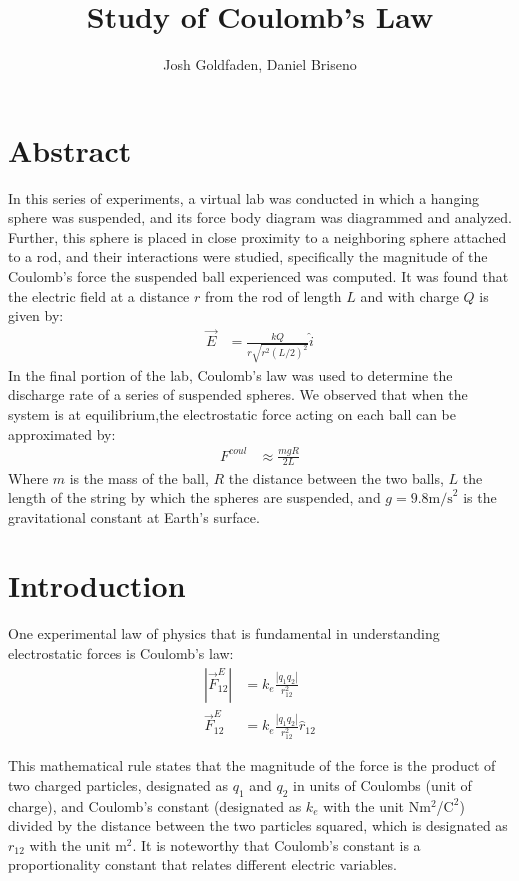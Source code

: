 \documentclass[oneside,12pt]{amsart}
\title{Study of Coulomb's Law}
\author{Josh Goldfaden, Daniel Briseno}
\date{}
\begin{document}
	\maketitle
	\section{Abstract}
	In this series of experiments, a virtual lab was conducted in which a hanging sphere was suspended, and its force body diagram was diagrammed and analyzed. Further, this sphere is placed in close proximity to a neighboring sphere attached to a rod, and their interactions were studied, specifically the magnitude of the Coulomb's force the suspended ball experienced was computed. It was found that the electric field at a distance $r$ from the rod of length $L$ and with charge $Q$ is given by:
	\begin{align*}
		\vec{E} &=  \frac{kQ}{r\sqrt{r^2(L/2)^2}}\hat{i}
	\end{align*}
	In the final portion of the lab, Coulomb’s law was used to determine the discharge rate of a series of suspended spheres. We observed that when the system is at equilibrium,the electrostatic force acting on each ball can be approximated by: 
	\begin{align*}
	F^{coul} &\approx \frac{mgR}{2L}
	\end{align*}
	Where $m$ is the mass of the ball, $R$ the distance between the two balls, $L$ the length of the string by which the spheres are suspended, and $g= 9.8\text{m/s}^2$ is the gravitational constant at Earth's surface.
	\section{Introduction}
	One experimental law of physics that is fundamental in understanding electrostatic forces is Coulomb’s law: 
	\begin{align}
		|\vec{F}^E_{12}| &= k_e \frac{|q_1 q_2|}{r_{12}^2}\\
		\vec{F}^E_{12} &= k_e \frac{|q_1 q_2|}{r_{12}^2} \hat{r}_{12} 
	\end{align}
	
	\indent This mathematical rule states that the magnitude of the force is the product of two charged particles, designated as $q_1$ and $q_2$ in units of Coulombs (unit of charge), and Coulomb’s constant (designated as $k_e$ with the unit N$\text{m}^2$/$\text{C}^2$) divided by the distance between the two particles squared, which is designated as $r_{12}$ with the unit $\text{m}^2$. It is noteworthy that Coulomb’s constant is a proportionality constant that relates different electric variables.\\ 
	
\end{document}

